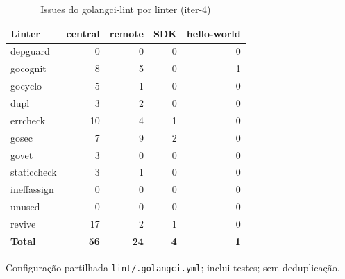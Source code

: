 \begin{table}[htbp]
  \centering\small
  \caption{Issues do golangci-lint por linter (iter-4)}
  \label{tab:iter-4-lint}
  \begin{tabular}{lrrrr}
    \toprule
    Linter & central & remote & SDK & hello-world \\
    \midrule
    depguard & 0 & 0 & 0 & 0 \\
    gocognit & 8 & 5 & 0 & 1 \\
    gocyclo & 5 & 1 & 0 & 0 \\
    dupl & 3 & 2 & 0 & 0 \\
    errcheck & 10 & 4 & 1 & 0 \\
    gosec & 7 & 9 & 2 & 0 \\
    govet & 3 & 0 & 0 & 0 \\
    staticcheck & 3 & 1 & 0 & 0 \\
    ineffassign & 0 & 0 & 0 & 0 \\
    unused & 0 & 0 & 0 & 0 \\
    revive & 17 & 2 & 1 & 0 \\
    \textbf{Total} & \textbf{56} & \textbf{24} & \textbf{4} & \textbf{1} \\
    \bottomrule
  \end{tabular}
  \par\smallskip\footnotesize Configuração partilhada \texttt{lint/.golangci.yml}; inclui testes; sem deduplicação.
\end{table}
